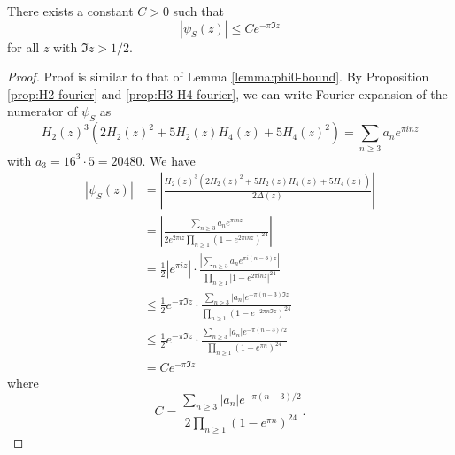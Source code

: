 \begin{lemma}\label{lemma:psiS-bound}
There exists a constant $C > 0$ such that
\begin{equation}\label{eqn:psiS-bound}
|\psi_S(z)| \le C e^{- \pi \Im z}
\end{equation}
for all $z$ with $\Im z > 1/2$.
\end{lemma}
\begin{proof}
Proof is similar to that of Lemma \ref{lemma:phi0-bound}.
By Proposition \ref{prop:H2-fourier} and \ref{prop:H3-H4-fourier}, we can write Fourier expansion of the numerator of $\psi_S$ as
\begin{equation}
    H_2(z)^3 (2 H_2(z)^2 + 5 H_2(z) H_4(z) + 5 H_4(z)^2) = \sum_{n \ge 3} a_n e^{\pi i n z}
\end{equation}
with $a_3 = 16^3 \cdot 5 = 20480$.
We have
\begin{align}
    |\psi_S(z)| &= \left|\frac{H_2(z)^3 (2 H_2(z)^2 + 5 H_2(z) H_4(z) + 5 H_4(z))}{2 \Delta(z)}\right| \\
    &= \left|\frac{\sum_{n \ge 3} a_n e^{\pi i n z}}{2 e^{2\pi i z} \prod_{n \ge 1} (1 - e^{2\pi i n z})^{24}}\right| \\
    &= \frac{1}{2}|e^{\pi i z}| \cdot \frac{|\sum_{n \ge 3} a_n e^{\pi i (n-3) z}|}{\prod_{n \ge 1} |1 - e^{2\pi i n z}|^{24}} \\
    &\le \frac{1}{2} e^{-\pi \Im z} \cdot \frac{\sum_{n \ge 3} |a_n| e^{-\pi (n-3) \Im z}}{\prod_{n \ge 1} (1 - e^{-2 \pi n \Im z})^{24}} \\
    &\le \frac{1}{2} e^{-\pi \Im z} \cdot \frac{\sum_{n \ge 3} |a_n| e^{-\pi (n - 3) / 2}}{\prod_{n \ge 1} (1 - e^{\pi n})^{24}} \\
    &= C e^{-\pi \Im z}
\end{align}
where
\begin{equation}
    C = \frac{\sum_{n \ge 3} |a_n| e^{-\pi (n - 3) / 2}}{2\prod_{n \ge 1} (1 - e^{\pi n})^{24}}.
\end{equation}
\end{proof}

